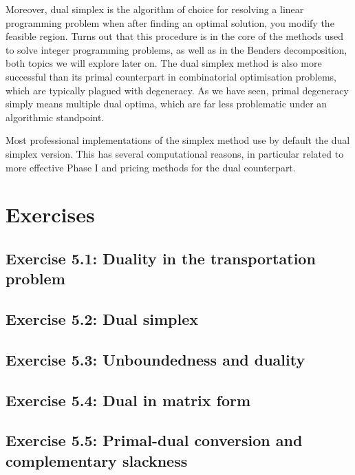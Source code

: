 Moreover, dual simplex is the algorithm of choice for resolving a linear programming problem when after finding an optimal solution, you modify the feasible region. Turns out that this procedure is in the core of the methods used to solve integer programming problems, as well as in the Benders decomposition, both topics we will explore later on. The dual simplex method is also more successful than its primal counterpart in combinatorial optimisation problems, which are typically plagued with degeneracy. As we have seen, primal degeneracy simply means multiple dual optima, which are far less problematic under an algorithmic standpoint.

Most professional implementations of the simplex method use by default the dual simplex version. This has several computational reasons, in particular related to more effective Phase I and pricing methods for the dual counterpart.

 
\section{Exercises}

\subsection*{Exercise 5.1: Duality in the transportation problem}


\subsection*{Exercise 5.2: Dual simplex}


\subsection*{Exercise 5.3: Unboundedness and duality}


\subsection*{Exercise 5.4: Dual in matrix form}


\subsection*{Exercise 5.5: Primal-dual conversion and complementary slackness}






